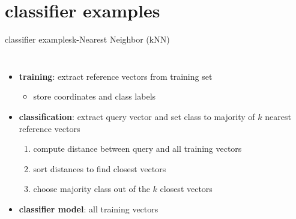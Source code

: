      \section[examples]{classifier examples}
        \begin{frame}{classifier examples}{k-Nearest Neighbor (kNN)}
            \begin{columns}
                    \begin{itemize}
                        \item	\textbf{training}: extract reference vectors from training set 
                            \begin{itemize}
                                \item store coordinates and class labels
                            \end{itemize}
                        \item<2->	\textbf{classification}: extract query vector and set class to majority of $k$ nearest reference vectors
                            \begin{enumerate}
                                \item   compute distance between query and all training vectors
                                \item   sort distances to find closest vectors
                                \item   choose majority class out of the $k$ closest vectors
                            \end{enumerate}
                        \bigskip
                        \item<3->	\textbf{classifier model}: all training vectors
                    \end{itemize}
            \end{columns}
        \end{frame}
